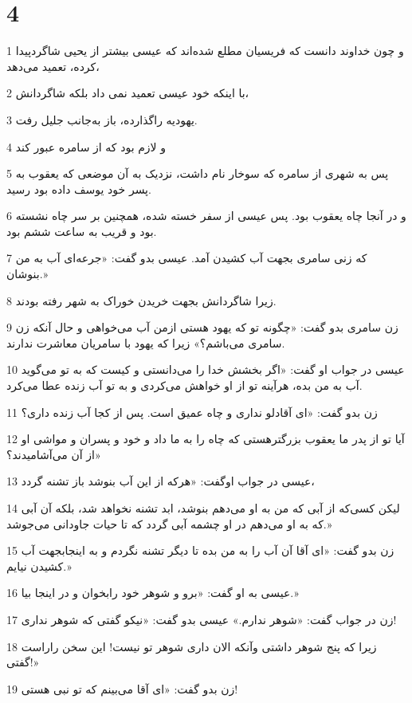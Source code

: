 \chapter{4}

\par 1 و چون خداوند دانست که فریسیان مطلع شده‌اند که عیسی بیشتر از یحیی شاگردپیدا کرده، تعمید می‌دهد،
\par 2 با اینکه خود عیسی تعمید نمی داد بلکه شاگردانش،
\par 3 یهودیه راگذارده، باز به‌جانب جلیل رفت.
\par 4 و لازم بود که از سامره عبور کند
\par 5 پس به شهری از سامره که سوخار نام داشت، نزدیک به آن موضعی که یعقوب به پسر خود یوسف داده بود رسید.
\par 6 و در آنجا چاه یعقوب بود. پس عیسی از سفر خسته شده، همچنین بر سر چاه نشسته بود و قریب به ساعت ششم بود.
\par 7 که زنی سامری بجهت آب کشیدن آمد. عیسی بدو گفت: «جرعه‌ای آب به من بنوشان.»
\par 8 زیرا شاگردانش بجهت خریدن خوراک به شهر رفته بودند.
\par 9 زن سامری بدو گفت: «چگونه تو که یهود هستی ازمن آب می‌خواهی و حال آنکه زن سامری می‌باشم؟» زیرا که یهود با سامریان معاشرت ندارند.
\par 10 عیسی در جواب او گفت: «اگر بخشش خدا را می‌دانستی و کیست که به تو می‌گوید آب به من بده، هرآینه تو از او خواهش می‌کردی و به تو آب زنده عطا می‌کرد.
\par 11 زن بدو گفت: «ای آقادلو نداری و چاه عمیق است. پس از کجا آب زنده داری؟
\par 12 آیا تو از پدر ما یعقوب بزرگترهستی که چاه را به ما داد و خود و پسران و مواشی او از آن می‌آشامیدند؟»
\par 13 عیسی در جواب اوگفت: «هر‌که از این آب بنوشد باز تشنه گردد،
\par 14 لیکن کسی‌که از آبی که من به او می‌دهم بنوشد، ابد تشنه نخواهد شد، بلکه آن آبی که به او می‌دهم در او چشمه آبی گردد که تا حیات جاودانی می‌جوشد.»
\par 15 زن بدو گفت: «ای آقا آن آب را به من بده تا دیگر تشنه نگردم و به اینجابجهت آب کشیدن نیایم.»
\par 16 عیسی به او گفت: «برو و شوهر خود رابخوان و در اینجا بیا.»
\par 17 زن در جواب گفت: «شوهر ندارم.» عیسی بدو گفت: «نیکو گفتی که شوهر نداری!
\par 18 زیرا که پنج شوهر داشتی وآنکه الان داری شوهر تو نیست! این سخن راراست گفتی!»
\par 19 زن بدو گفت: «ای آقا می‌بینم که تو نبی هستی!
